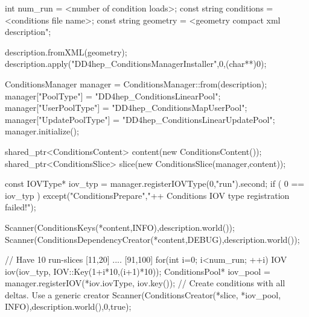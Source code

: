 \documentclass[10pt,a4paper]{article}
\begin{document}
\begin{code}
  int          num_run    = <number of condition loads>;
  const string conditions = <conditions file name>;
  const string geometry   = <geometry compact xml description";

  description.fromXML(geometry);
  description.apply("DD4hep_ConditionsManagerInstaller",0,(char**)0);

  ConditionsManager manager = ConditionsManager::from(description);
  manager["PoolType"]       = "DD4hep_ConditionsLinearPool";
  manager["UserPoolType"]   = "DD4hep_ConditionsMapUserPool";
  manager["UpdatePoolType"] = "DD4hep_ConditionsLinearUpdatePool";
  manager.initialize();

  shared_ptr<ConditionsContent> content(new ConditionsContent());
  shared_ptr<ConditionsSlice>   slice(new ConditionsSlice(manager,content));

  const IOVType*    iov_typ = manager.registerIOVType(0,"run").second;
  if ( 0 == iov_typ )
    except("ConditionsPrepare","++ Conditions IOV type registration failed!");

  Scanner(ConditionsKeys(*content,INFO),description.world());
  Scanner(ConditionsDependencyCreator(*content,DEBUG),description.world());

  // Have 10 run-slices [11,20] .... [91,100]
  for(int i=0; i<num_run; ++i)  {
    IOV iov(iov_typ, IOV::Key(1+i*10,(i+1)*10));
    ConditionsPool*   iov_pool = manager.registerIOV(*iov.iovType, iov.key());
    // Create conditions with all deltas. Use a generic creator
    Scanner(ConditionsCreator(*slice, *iov_pool, INFO),description.world(),0,true);
  }

\end{code}
\end{document}
